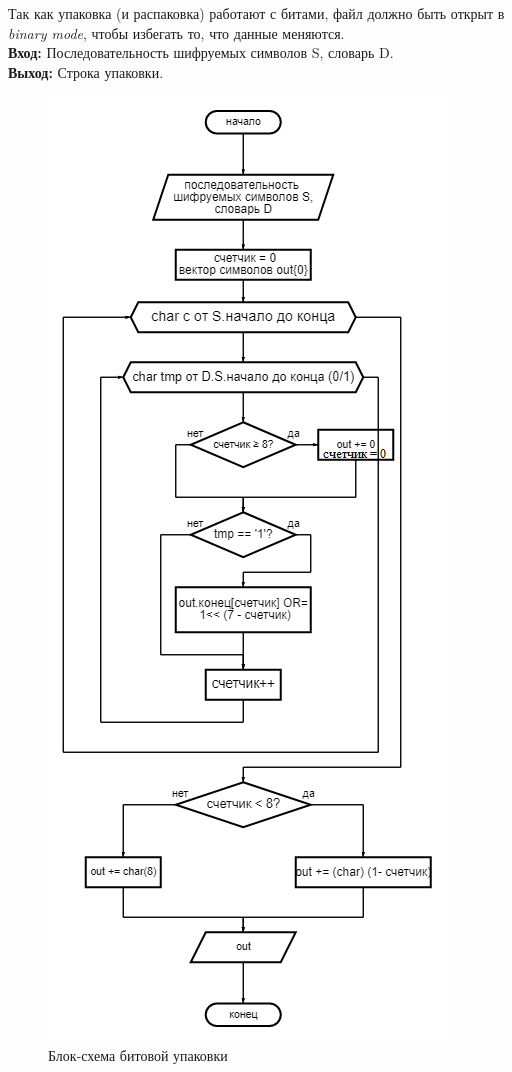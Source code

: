 \documentclass[12pt]{article} %
\begin{document}
Так как упаковка (и распаковка) работают с битами, файл должно быть открыт в \textit{binary mode}, чтобы избегать то, что данные меняются. \\
\textbf{Вход: }Последовательность шифруемых символов S, словарь D. \\
\textbf{Выход: } Строка упаковки. 
 \begin{figure}[H]
\centering \includegraphics[scale =0.75]{pack.png}
\caption{Блок-схема битовой упаковки}
\end{figure}
\newpage
\end{document}
